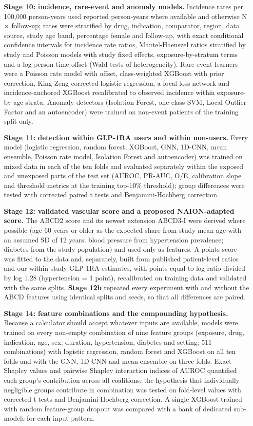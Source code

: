 \documentclass[journal]{IEEEtran}
\begin{document}
\textbf{Stage 10: incidence, rare-event and anomaly models.}
Incidence rates per 100,000 person-years used reported person-years
where available and otherwise N \ensuremath{\times} follow-up; rates were stratified by
drug, indication, comparator, region, data source, study age band,
percentage female and follow-up, with exact conditional confidence
intervals for incidence rate ratios, Mantel-Haenszel ratios stratified
by study and Poisson models with study fixed effects,
exposure-by-stratum terms and a log person-time offset (Wald tests of
heterogeneity). Rare-event learners were a Poisson rate model with
offset, class-weighted XGBoost with prior correction, King-Zeng
corrected logistic regression, a focal-loss network and
incidence-anchored XGBoost recalibrated to observed incidence within
exposure-by-age strata. Anomaly detectors (Isolation Forest, one-class
SVM, Local Outlier Factor and an autoencoder) were trained on non-event
patients of the training split only.

\textbf{Stage 11: detection within GLP-1RA users and within
non-users.} Every model (logistic regression, random forest, XGBoost,
GNN, 1D-CNN, mean ensemble, Poisson rate model, Isolation Forest and
autoencoder) was trained on mixed data in each of the ten folds and
evaluated separately within the exposed and unexposed parts of the test
set (AUROC, PR-AUC, O/E, calibration slope and threshold metrics at the
training top-10\% threshold); group differences were tested with
corrected paired t tests and Benjamini-Hochberg correction.

\textbf{Stage 12: validated vascular score and a proposed
NAION-adapted score.} The ABCD2 score and its newest extension ABCD3-I
were derived where possible (age 60 years or older as the expected share
from study mean age with an assumed SD of 12 years; blood pressure from
hypertension prevalence; diabetes from the study population) and used
only as features. A points score was fitted to the data and, separately,
built from published patient-level ratios and our within-study GLP-1RA
estimates, with points equal to log ratio divided by log 1.28
(hypertension = 1 point), recalibrated on training data and validated
with the same splits. \textbf{Stage 12b} repeated every experiment with
and without the ABCD features using identical splits and seeds, so that
all differences are paired.

\textbf{Stage 14: feature combinations and the compounding
hypothesis.} Because a calculator should accept whatever inputs are
available, models were trained on every non-empty combination of nine
feature groups (exposure, drug, indication, age, sex, duration,
hypertension, diabetes and setting; 511 combinations) with logistic
regression, random forest and XGBoost on all ten folds and with the GNN,
1D-CNN and mean ensemble on three folds. Exact Shapley values and
pairwise Shapley interaction indices of AUROC quantified each group's
contribution across all coalitions; the hypothesis that individually
negligible groups contribute in combination was tested on fold-level
values with corrected t tests and Benjamini-Hochberg correction. A
single XGBoost trained with random feature-group dropout was compared
with a bank of dedicated sub-models for each input pattern.
\end{document}
